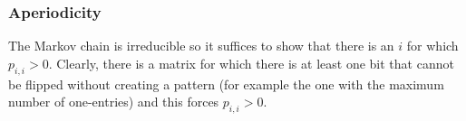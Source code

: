 \subsubsection{Aperiodicity}
The Markov chain is irreducible so it suffices to show that there is an $i$ for which $p_{i,i}>0$. Clearly, there is a matrix for which there is at least one bit that cannot be flipped without creating a pattern (for example the one with the maximum number of one-entries) and this forces $p_{i,i}>0$.